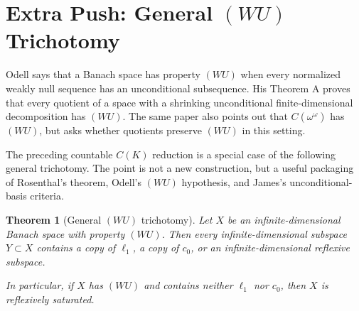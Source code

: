 \documentclass[11pt]{article}
\newtheorem*{theorem}{Theorem}
\begin{document}
\section*{Extra Push: General \((WU)\) Trichotomy}

Odell \cite{Odell} says that a Banach space has property \((WU)\) when every normalized weakly null sequence has an unconditional subsequence.  His Theorem A proves that every quotient of a space with a shrinking unconditional finite-dimensional decomposition has \((WU)\).  The same paper also points out that \(C(\omega^\omega)\) has \((WU)\), but asks whether quotients preserve \((WU)\) in this setting.

The preceding countable \(C(K)\) reduction is a special case of the following general trichotomy.  The point is not a new construction, but a useful packaging of Rosenthal's theorem, Odell's \((WU)\) hypothesis, and James's unconditional-basis criteria.

\begin{theorem}[General \((WU)\) trichotomy]
Let \(X\) be an infinite-dimensional Banach space with property \((WU)\).  Then every infinite-dimensional subspace \(Y\subset X\) contains a copy of \(\ell_1\), a copy of \(c_0\), or an infinite-dimensional reflexive subspace.

In particular, if \(X\) has \((WU)\) and contains neither \(\ell_1\) nor \(c_0\), then \(X\) is reflexively saturated.
\end{theorem}
\end{document}
